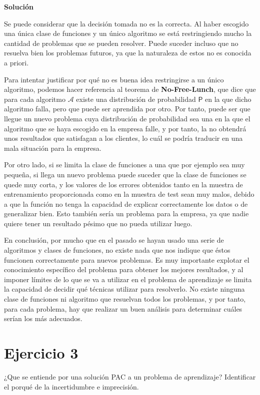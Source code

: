 \documentclass[11pt,a4paper]{article}
\newcommand{\answer}{\noindent\textbf{Solución}}
\newcommand{\addtoc}[1]{\addcontentsline{toc}{section}{#1}}
\begin{document}
\answer

Se puede considerar que la decisión tomada no es la correcta. Al haber escogido una única clase de funciones y un único
algoritmo se está restringiendo mucho la cantidad de problemas que se pueden resolver. Puede suceder incluso que no resuelva
bien los problemas futuros, ya que la naturaleza de estos no es conocida a priori.

Para intentar justificar por qué no es buena idea restringirse a un único algoritmo, podemos hacer referencia al teorema de
\textbf{No-Free-Lunch}, que dice que para cada algoritmo $\mathcal{A}$ existe una distribución de probabilidad $\mathsf{P}$
en la que dicho algoritmo falla, pero que puede ser aprendida por otro. Por tanto, puede ser que llegue un nuevo problema
cuya distribución de probabilidad sea una en la que el algoritmo que se haya escogido en la empresa falle, y por tanto, la
no obtendrá unos resultados que satisfagan a los clientes, lo cuál se podría traducir en una mala situación para la empresa.

Por otro lado, si se limita la clase de funciones a una que por ejemplo sea muy pequeña, si llega un nuevo problema
puede suceder que la clase de funciones se quede muy corta, y los valores de los errores obtenidos tanto en la muestra de
entrenamiento proporcionada como en la muestra de test sean muy malos, debido a que la función no
tenga la capacidad de explicar correctamente los datos o de generalizar bien. Esto también sería un problema para la empresa,
ya que nadie quiere tener un resultado pésimo que no pueda utilizar luego.

En conclusión, por mucho que en el pasado se hayan usado una serie de algoritmos y clases de funciones, no existe nada
que nos indique que éstos funcionen correctamente para nuevos problemas. Es muy importante explotar el conocimiento específico
del problema para obtener los mejores resultados, y al imponer límites de lo que se va a utilizar
en el problema de aprendizaje se limita la capacidad de decidir qué técnicas utilizar para resolverlo. No existe
ninguna clase de funciones ni algoritmo que resuelvan todos los problemas, y por tanto, para cada problema, hay que realizar
un buen análisis para determinar cuáles serían los más adecuados.

\section*{Ejercicio 3}
\addtoc{Ejercicio 3}

\noindent ¿Que se entiende por una solución PAC a un problema de aprendizaje? Identificar el porqué de la incertidumbre e
imprecisión.
\end{document}
